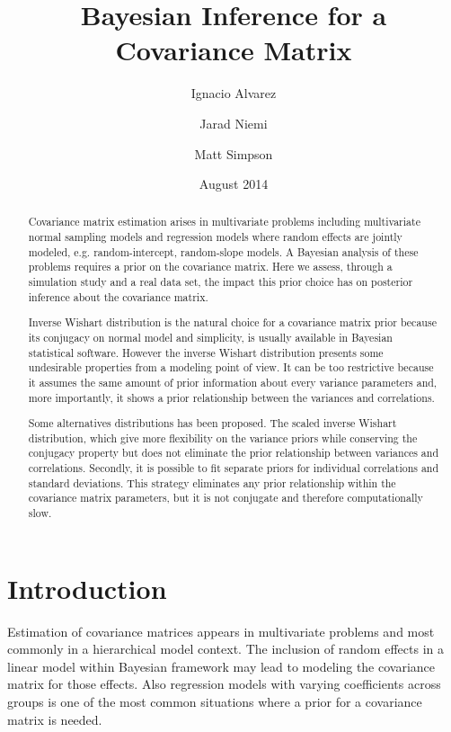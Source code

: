 \documentclass[a4paper]{article}
\title{Bayesian Inference for a Covariance Matrix}
\author[1]{Ignacio Alvarez }
\author[1]{Jarad Niemi }
\author[2]{ Matt Simpson}
\affil[1]{Department of Statistics, Iowa State University}
\affil[2]{Department of Statistics and Department of Economics, Iowa State University}
\date{ August 2014 }
\begin{document}
 
\maketitle 


\begin{abstract}
Covariance matrix estimation arises in multivariate problems including multivariate normal sampling models and regression models where random effects are jointly modeled, e.g. random-intercept, random-slope models. A Bayesian analysis of these problems requires a prior on the covariance matrix. Here we assess, through a simulation study and a real data set, the impact this prior choice has on posterior inference about the covariance matrix.

Inverse Wishart distribution is the natural choice for a covariance matrix prior because its conjugacy on normal model and simplicity, is usually available in Bayesian statistical software. However the  inverse Wishart distribution presents some undesirable properties from a modeling point of view. It can be too restrictive because it assumes the same amount of prior information about every variance parameters and, more importantly, it shows a prior relationship between the variances and correlations. 

Some alternatives distributions has been proposed. The scaled inverse Wishart distribution, which give more flexibility on the variance priors while conserving the conjugacy property but does not eliminate the prior relationship between variances and correlations. Secondly, it is possible to fit separate priors for individual correlations and standard deviations. This strategy eliminates any prior relationship within the covariance matrix parameters, but it is not conjugate and therefore computationally slow. 
\end{abstract}


\newpage 

{} 

\section{Introduction} 

Estimation of covariance matrices appears in multivariate problems and most commonly in a hierarchical model context. The inclusion of random effects in a linear model within Bayesian framework may lead to modeling the covariance matrix for those effects. Also regression models with varying coefficients across groups is one of the most common situations where a prior for a covariance matrix is needed. 
\end{document}
